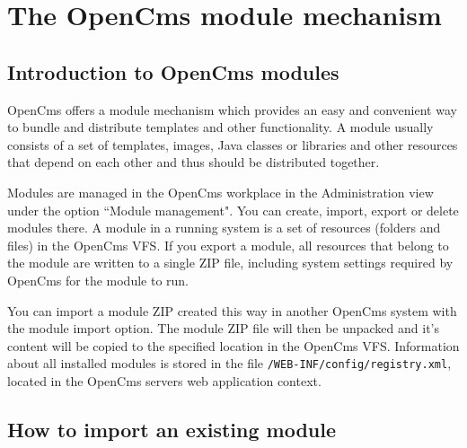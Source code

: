 \chapter{The OpenCms module mechanism}
\section{Introduction to OpenCms modules}
OpenCms offers a module mechanism which provides an easy and convenient way to bundle and distribute templates 
and other functionality. A module usually consists of a set of templates, images, Java classes or libraries 
and other resources that depend on each other and thus should be distributed together.

Modules are managed in the OpenCms workplace in the Administration view under the option ``Module management". 
You can create, import, export or delete modules there. 
A module in a running system is a set of resources (folders and files) in the OpenCms VFS. 
If you export a module, all resources that belong to the module are written to a single ZIP file, 
including system settings required by OpenCms for the module to run.

You can import a module ZIP created this way in another OpenCms system with the module import option. 
The module ZIP file will then be unpacked and it's content will be copied to the specified location in the OpenCms VFS. 
Information about all installed modules is stored in the file \texttt{/WEB-INF/config/registry.xml}, 
located in the OpenCms servers web application context.

\section{How to import an existing module}

